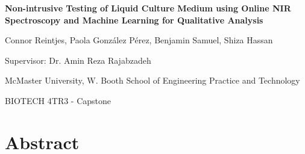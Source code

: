 \documentclass[12pt]{report}
\newcommand{\setparindent}{
    \setlength{\parskip}{1em} %
    \setlength{\parindent}{2.5em} %
}
\newcommand\titleofdoc{Non-intrusive Testing of Liquid Culture Medium using Online NIR Spectroscopy and Machine Learning for Qualitative Analysis} %
\begin{document}
\begin{titlepage}
   \begin{center}
        \vspace*{2.5cm} %

        \Large{\bfseries{\titleofdoc}} 

        \vspace{0.5cm}
            
        \vspace{3cm}
       
        \vspace{0.25cm}
        \large{Connor Reintjes, Paola Gonz\'alez P\'erez, Benjamin Samuel, Shiza Hassan}

        \vspace{0.25cm}
        \large{Supervisor: Dr. Amin Reza Rajabzadeh}
       
        \vspace{3 cm}
        \large{McMaster University, W. Booth School of Engineering Practice and Technology}
        
        \vspace{0.25 cm}
        \large{BIOTECH 4TR3 - Capstone}
       

       \vfill
    \end{center}
\end{titlepage}

\setcounter{page}{2}
\pagestyle{fancy}
\fancyhf{}
\rhead{\thepage}


\chapter*{Abstract}
\setparindent
\end{document}
